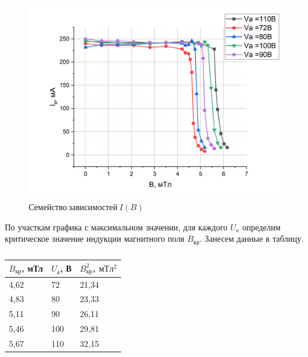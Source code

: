 \documentclass[a4paper,12pt]{article}
\begin{document}
\newpage

\begin{figure}[h!]
	\begin{center}
	\includegraphics[scale=0.5]{graph8}
	\end{center}
	\caption{$Семейство \ зависимостей \ I(B)$ }
	\end{figure}

По участкам графика с максимальном значении, для каждого $U_a$ определим критическое значение индукции магнитного поля $B_{кр}$. Занесем данные в таблицу.

\newpage

\begin{table}[h!]
\caption{}
\begin{center}
\begin{tabular}{|l|l|l|}
\hline 
{{$B_{кр}$, мТл}} & {{$U_а$, В}} & \textit{\textbf{$B_{кр}^2$, $мТл^2$}} \\ \hline
{4,62}              & {72}             & {21,34}               \\ \hline
4,83                       & 80                      & 23,33                        \\ \hline
5,11                       & 90                      & 26,11                        \\ \hline
5,46                       & 100                     & 29,81                        \\ \hline
5,67                       & 110                     & 32,15                        \\ \hline
\end{tabular}
\end{center}
\end{table}
\end{document}
